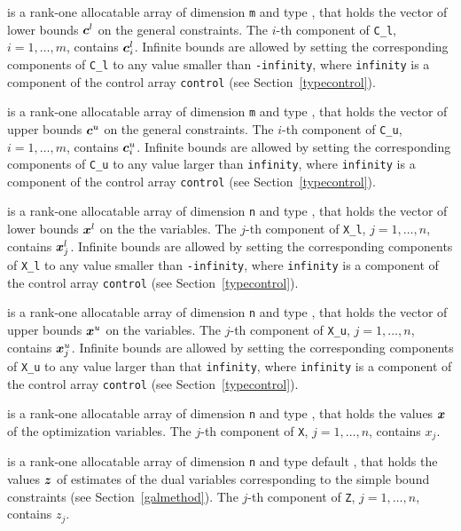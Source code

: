 \documentclass{galahad}
\begin{document}
\begin{description}
\begin{description}
\end{description}

 is a rank-one allocatable array of dimension {\tt m} and type 
\realdp, that holds the vector of lower bounds ${\bm{c}}^{l}$ 
on the general constraints. The $i$-th component of 
{\tt C\_l}, $i = 1, \ldots , m$, contains ${\bm{c}}_{i}^{l}$.
Infinite bounds are allowed by setting the corresponding 
components of {\tt C\_l} to any value smaller than {\tt -infinity}, 
where {\tt infinity} is a component of the control array {\tt control} 
(see Section~\ref{typecontrol}).

 is a rank-one allocatable array of dimension {\tt m} and type 
\realdp, that holds the vector of upper bounds ${\bm{c}}^{u}$ 
on the general constraints. The $i$-th component of 
{\tt C\_u}, $i = 1,  \ldots ,  m$, contains ${\bm{c}}_{i}^{u}$.
Infinite bounds are allowed by setting the corresponding 
components of {\tt C\_u} to any value larger than {\tt infinity}, 
where {\tt infinity} is a component of the control array {\tt control} 
(see Section~\ref{typecontrol}).

 is a rank-one allocatable array of dimension {\tt n} and type 
\realdp, that holds
the vector of lower bounds ${\bm{x}}^{l}$ on the the variables.
The $j$-th component of {\tt X\_l}, $j = 1, \ldots , n$, 
contains ${\bm{x}}_{j}^{l}$.
Infinite bounds are allowed by setting the corresponding 
components of {\tt X\_l} to any value smaller than {\tt -infinity}, 
where {\tt infinity} is a component of the control array {\tt control} 
(see Section~\ref{typecontrol}).

 is a rank-one allocatable array of dimension {\tt n} and type 
\realdp, that holds
the vector of upper bounds ${\bm{x}}^{u}$ on the variables.
The $j$-th component of {\tt X\_u}, $j = 1, \ldots , n$, 
contains ${\bm{x}}_{j}^{u}$.
Infinite bounds are allowed by setting the corresponding 
components of {\tt X\_u} to any value larger than that {\tt infinity}, 
where {\tt infinity} is a component of the control array {\tt control} 
(see Section~\ref{typecontrol}).

 is a rank-one allocatable array of dimension {\tt n} and type 
\realdp, 
that holds the values ${\bm{x}}$ of the optimization variables.
The $j$-th component of {\tt X}, $j = 1,  \ldots , n$, contains $x_{j}$.  

 is a rank-one allocatable array of dimension {\tt n} and type default 
\realdp, that holds
the values ${\bm{z}}$ of estimates  of the dual variables 
corresponding to the simple bound constraints (see Section~\ref{galmethod}).
The $j$-th component of {\tt Z}, $j = 1,  \ldots ,  n$, contains $z_{j}$.  


\end{description}
\end{document}
